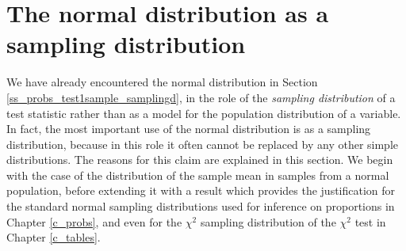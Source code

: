 \section{The normal distribution as a sampling distribution}
\label{s_contd_clt}

We have already encountered the normal distribution in Section
\ref{ss_probs_test1sample_samplingd}, in the role of the \emph{sampling
distribution} of a test statistic rather than as a model for the population
distribution of a variable. In fact, the most important use of the
normal distribution is as a sampling distribution, because in this role
it often cannot be replaced by any other simple distributions. The
reasons for this claim are explained in this section. We begin with the
case of the distribution of the sample mean in samples from a
normal population, before extending it with a result
which provides the justification for the
standard normal sampling distributions used for inference on proportions
in Chapter \ref{c_probs}, and even for the $\chi^{2}$ sampling distribution
of the $\chi^{2}$ test in Chapter \ref{c_tables}.

